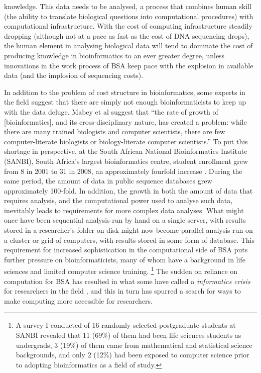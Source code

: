 \documentclass[a4paper,10pt]{scrreprt} \usepackage[utf8]{inputenc}
\begin{document}
knowledge. This data needs to be analysed, a process that combines human skill
(the ability to translate biological questions into computational procedures)
with computational infrastructure. With the cost of computing infrastructure
steadily dropping (although not at a pace as fast as the cost of DNA sequencing
drops), the human element in analysing biological data will tend to dominate the
cost of producing knowledge in bioinformatics to an ever greater degree, unless
innovations in the work process of \gls{BSA} keep pace with the explosion in
available data (and the implosion of sequencing costs).

In addition to the problem of cost structure in bioinformatics, some experts in the field suggest that there are simply not enough bioinformaticists to keep up with the data deluge. Mabey et al \cite{mabey_report_2005} suggest that ``the rate of growth of [bioinformatics], and its cross-disciplinary nature, has created a problem: while there are many trained biologists and computer scientists, there are few computer-literate biologists or biology-literate computer scientists.'' To put this shortage in perspective, at the South African National Bioinformatics Institute (SANBI), South Africa's largest bioinformatics centre, student enrollment grew from 8 in 2001 to 31 in 2008, an approximately fourfold increase \cite{south_african_national_bioinformatics_institute_south_2010}. During the same period, the amount of data in public sequence databases grew approximately 100-fold.  In addition, the growth in both the amount of data that requires analysis, and the computational power used to analyse such data, 
inevitably leads to requirements for more complex data analyses. What might once have been sequential analysis run by hand on a single server, with results stored in a researcher's folder on disk might now become parallel analysis run on a cluster or grid of computers, with results stored in some form of database. This requirement for increased sophistication in the computational side of \gls{BSA} puts further pressure on bioinformaticists, many of whom have a background in life sciences and limited computer science training. \footnote{A survey I conducted of 16 randomly selected postgraduate students at SANBI revealed that 11 (69\%) of them had been life sciences students as undergrads, 3 (19\%) of them came from mathematical and statistical science backgrounds, and only 2 (12\%) had been exposed to computer science prior to adopting bioinformatics as a field of study.} The sudden on reliance on computation for \gls{BSA} has resulted in what some have called a \emph{informatics crisis} for researchers in 
the field \cite{goecks_galaxy:_2010}, and this in turn has spurred a search for ways to make computing more accessible for researchers.
\end{document}
